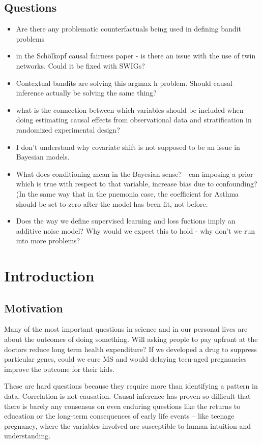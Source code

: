 \documentclass[11pt,a4paper,oneside]{book}
\theoremstyle{plain}
\theoremstyle{definition}
\begin{document}
\section*{Questions}
\begin{itemize}
\item Are there any problematic counterfactuals being used in defining bandit problems
\item in the Schölkopf causal fairness paper - is there an issue with the use of twin networks. Could it be fixed with SWIGs?
\item Contextual bandits are solving this argmax h problem. Should causal inference actually be solving the same thing?
\item what is the connection between which variables should be included when doing estimating causal effects from observational data and stratification in randomized experimental design?
\item I don't understand why covariate shift is not supposed to be an issue in Bayesian models. 
\item What does conditioning mean in the Bayesian sense? - can imposing a prior which is true with respect to that variable, increase bias due to confounding? (In the same way that in the pnemonia case, the coefficient for Asthma should be set to zero after the model has been fit, not before. 


\item Does the way we define supervised learning and loss fuctions imply an additive noise model? Why would we expect this to hold - why don't we run into more problems?
 

\end{itemize}

\chapter{Introduction}


\section{Motivation}
Many of the most important questions in science and in our personal lives are about the outcomes of doing something. Will asking people to pay upfront at the doctors reduce long term health expenditure? If we developed a drug to suppress particular genes, could we cure MS and would delaying teen-aged pregnancies improve the outcome for their kids.  

These are hard questions because they require more than identifying a pattern in data. Correlation is not causation. Causal inference has proven so difficult that there is barely any consensus on even enduring questions like the returns to education or the long-term consequences of early life events – like teenage pregnancy, where the variables involved are susceptible to human intuition and understanding. 
\end{document}
